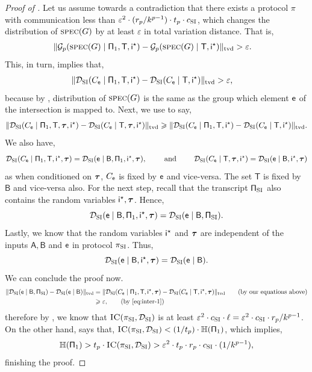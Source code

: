 \documentclass[11pt]{article}
\theoremstyle{definition}
\renewcommand{\geq}{\geqslant}
\newcommand{\tvd}[2]{\ensuremath{\norm{#1 - #2}_{\mathrm{tvd}}}}
\newcommand{\eps}{\ensuremath{\varepsilon}}
\newcommand{\norm}[1]{\ensuremath{\|#1\|}}
\newcommand{\rv}[1]{\ensuremath{{\mathsf{#1}}}\xspace}
\newcommand{\rA}{\rv{A}}
\newcommand{\rB}{\rv{B}}
\newcommand{\HH}{\ensuremath{\mathbb{H}}}
\newcommand{\en}[1]{\ensuremath{\HH(#1)}}
\newcommand{\cG}{\ensuremath{\mathcal{G}}}
\newcommand{\spec}{\ensuremath{\textnormal{\textsc{spec}}}}
\newcommand{\prot}{\ensuremath{\pi}}
\newcommand{\Prot}{\ensuremath{\Pi}}
\newcommand{\rProt}{\ensuremath{\rv{\Prot}}}
\newcommand{\ic}{\ensuremath{\textnormal{\textsc{IC}}}}
\newcommand{\cDSI}{\ensuremath{\mathcal{D}_{\textnormal{\textsc{SI}}}}}
\newcommand{\rT}{\ensuremath{\rv{T}}}
\newcommand{\protsetint}{\ensuremath{\prot_{\textnormal{\textsc{SI}}}}}
\begin{document}
	\begin{proof}[Proof of ]
		Let us assume towards a contradiction that there exists a protocol $\prot$ with communication less than $\eps^2 \cdot (r_p/k^{p-1}) \cdot t_p \cdot \cSI$, which changes the distribution of $\spec(G)$ by at least $\eps$ in total variation distance. 
		That is, 
		\begin{align*}
			\tvd{\cG_p(\spec(G) \mid \rProt_1 , \rT, \ristar)}{\cG_p(\spec(G) \mid \rT, \ristar)} &> \eps.
			\end{align*}
			This, in turn, implies that,
		\begin{align}
			\tvd{\cDSI(C_{\re} \mid \rProt_1 , \rT, \ristar)}{\cDSI(C_{\re} \mid \rT, \ristar)} &> \eps,\label{eq:inter-1}
		\end{align}
	because by , distribution of $\spec(G)$ is the same as the group which element $\re$ of the intersection is mapped to. 
	Next, we use  to say,
		\begin{align*}
			\tvd{\cDSI(C_{\re} \mid \rProt_1 , \rT, \rtau, \ristar)}{\cDSI(C_{\re} \mid \rT, \rtau, \ristar)} 
			\geq \tvd{\cDSI(C_{\re} \mid \rProt_1 , \rT, \ristar)}{\cDSI(C_{\re} \mid \rT, \ristar)}.
		\end{align*}
		We also have, 
		\begin{align*}
			\cDSI(C_{\re} \mid \rProt_1, \rT, \ristar, \rtau) 
			= \cDSI(\re \mid \rB, \rProt_1,  \ristar, \rtau),  \qquad \textnormal{ and } \qquad 
		\cDSI(C_{\re} \mid \rT, \rtau, \ristar) = \cDSI(\re \mid \rB, \ristar, \rtau)
		\end{align*}
		as when conditioned on $\bm{\tau}$, $C_{\re}$ is fixed by $\re$ and vice-versa. The set $\rT$ is fixed by $\rB$ and vice-versa also. For the next step, recall that the transcript $\rProtSI$ also contains the random variables $\ristar, \rtau$. Hence, 
		\[
		\cDSI(\re \mid \rB, \rProt_1,  \ristar, \rtau) = \cDSI(\re \mid \rB, \rProtSI). 
		\] 
		Lastly, we know that the random variables $\ristar$ and $\bm{\tau}$ are independent of the inputs $\rA, \rB$ and $\re$ in protocol $\protsetint$. Thus, 
		\[
		\cDSI(\re \mid \rB, \ristar, \rtau) = \cDSI(\re \mid \rB). 
		\]
		We can conclude the proof now. 
		\begin{align*}
			\tvd{\cDSI(\re \mid \rB, \rProtSI)}{\cDSI(\re \mid \rB)} 
			&= \tvd{\cDSI(C_{\re} \mid \rProt_1 , \rT, \ristar, \rtau)}{\cDSI(C_{\re} \mid \rT, \ristar, \rtau)} \tag{by our equations above} \\
			&\geq \eps, \tag{by \Cref{eq:inter-1}}
		\end{align*}
		therefore by , we know that $\ic(\protsetint, \cDSI)$ is at least $\eps^2 \cdot \cSI \cdot \ell = \eps^2 \cdot \cSI \cdot r_p/k^{p-1}$. On the other hand,  says that, 
		$\ic(\protsetint, \cDSI)  < (1/t_p) \cdot \en{\rProt_1} $, which implies,
		\[
		\en{\rProt_1} > t_p \cdot \ic(\protsetint, \cDSI) > \eps^2 \cdot t_p \cdot r_p \cdot \cSI \cdot (1/k^{p-1}),
		\]
		finishing the proof.
	\end{proof}
	
\end{document}

